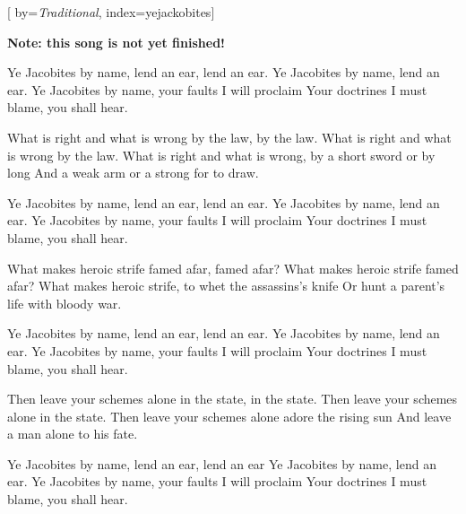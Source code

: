 

[%
    by={\textit{Traditional}},
    index={yejackobites}]


    \label{yejackobites}

    \textbf{Note: this song is not yet finished!}

    \beginchorus
        Ye Jacobites by name, lend an ear, lend an ear.
        Ye Jacobites by name, lend an ear.
        Ye Jacobites by name, your faults I will proclaim
        Your doctrines I must blame, you shall hear.
    \endchorus

    \beginverse
        What is right and what is wrong by the law, by the law.
        What is right and what is wrong by the law.
        What is right and what is wrong, by a short sword or by long
        And a weak arm or a strong for to draw.
    \endverse

    \beginchorus
        Ye Jacobites by name, lend an ear, lend an ear.
        Ye Jacobites by name, lend an ear.
        Ye Jacobites by name, your faults I will proclaim
        Your doctrines I must blame, you shall hear.
    \endchorus

    \beginverse
        What makes heroic strife famed afar, famed afar?
        What makes heroic strife famed afar?
        What makes heroic strife, to whet the assassins's knife
        Or hunt a parent's life with bloody war.
    \endverse

    \beginchorus
        Ye Jacobites by name, lend an ear, lend an ear.
        Ye Jacobites by name, lend an ear.
        Ye Jacobites by name, your faults I will proclaim
        Your doctrines I must blame, you shall hear.
    \endchorus

    \beginverse
        Then leave your schemes alone in the state, in the state.
        Then leave your schemes alone in the state.
        Then leave your schemes alone adore the rising sun
        And leave a man alone to his fate.
    \endverse

    \beginchorus
        Ye Jacobites by name, lend an ear, lend an ear
        Ye Jacobites by name, lend an ear.
        Ye Jacobites by name, your faults I will proclaim
        Your doctrines I must blame, you shall hear.
    \endchorus
\endsong
